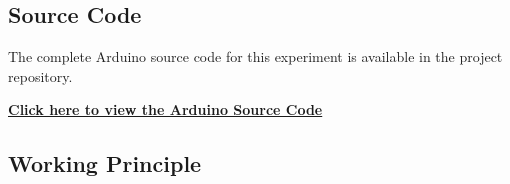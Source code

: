 
\subsection{Source Code}

The complete Arduino source code for this experiment is available in the project repository.

\href{https://github.com/YOUR_USERNAME/YOUR_REPOSITORY/blob/main/Exp-4/motor_On_off/file.ino}
{\textbf{Click here to view the Arduino Source Code}}


\subsection{Working Principle}


